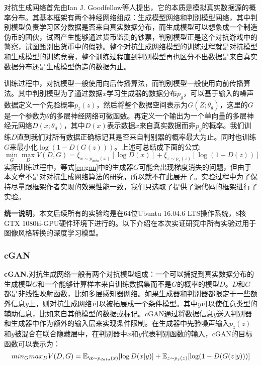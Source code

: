 对抗生成网络\cite{GAN}首先由Ian J. Goodfellow等人提出，它的本质是模拟真实数据源的概率分布。其基本框架有两个神经网络组成：生成模型网络和判别模型网络，其中判别模型负责学习区分数据是否来自真实数据分布，而生成模型可以想象成一个制造伪币的团伙，试图产生能够通过货币监测的钞票，判别模型正是这个对抗游戏中的警察，试图甄别出货币中的假钞。整个对抗生成网络模型的训练过程就是对抗模型和生成模型的训练竞赛，整个训练过程直到判别模型再也区分不出数据是来自真实数据分布还是生成模型伪造的数据为止。

训练过程中，对抗模型一般使用向后传播算法，而判别模型一般使用向前传播算法。其中判别模型为了通过数据$x$学习生成器的数据分布$p_g$，可以基于输入的噪声数据定义一个先验概率$p_z(z)$，然后将整个数据空间表示为$G(Z;\theta_g)$，这里的$G$是一个参数为$\theta$的多层神经网络可微函数。再定义一个输出为一个单向量的多层神经元网络$D(x;\theta_d)$，其中$D(x)$表示数据$x$来自真实数据而非$p_g$的概率。我们训练$D$直到我们对所有数据正确标记其是否来自判别器的概率最大为止。同时也训练$G$来最小化$\log(1-D(G(z)))$。上述可总结成下面的公式:
\begin{equation}
    \label{eq:gan}
    \min_G\max_DV(D,G)=\xi_{x\sim p_{data}(x)}[\log D(x)]+\xi_{z\sim p_z(z)}[\log(1-D(z))]
\end{equation}
实际训练过程中，等式\eqref{eq:gan}中的生成器$G$可能会出现梯度消失的问题，但由于本文章不是对对抗生成网络算法的研究，所以就不在此展开了。实验过程中为了保持尽量跟框架作者实现的效果性能一致，我们只选取了提供了源代码的框架进行了实验。

\textbf{统一说明}，本文后续所有的实验均是在64位Ubuntu 16.04.6 LTS操作系统，8核GTX 1080ti-GPU硬件环境下进行的。以下介绍在本次实证研究中所有实验过用于图像风格转换的深度学习模型。

\subsubsection{cGAN}

\textbf{cGAN.}\cite{cGAN}\quad 对抗生成网络一般有两个对抗模型组成：一个可以捕捉到真实数据分布的生成模型$G$和一个能够计算样本来自训练数据集而不是$G$的概率的模型$D$。$D$和$G$都是非线性映射函数，比如多层感知器网络。如果生成器和判别器都限定于一些额外信息$y$上，则对抗生成网络可以被拓展成一个条件模型。其中$y$可以使任意类型的辅助信息，比如来自其他模型的数据或标记。cGAN通过将数据信息$y$送入判别器和生成器中作为额外的输入层来实现条件限制。在生成器中先验噪声输入$p_z(z)$和$y$被混合在联合隐藏层中，在判别器中$x$和$y$代表判别函数的输入，cGAN的目标函数可以表示为：
\begin{gather}
    min_G max_D V(D,G)=\mathbb{E}_{\x\sim p_{data}(x)}[\log D(x|y)]+\mathbb{E}_{z\sim p_z(z)}[\log(1-D(G(z|y)))]
\end{gather}

